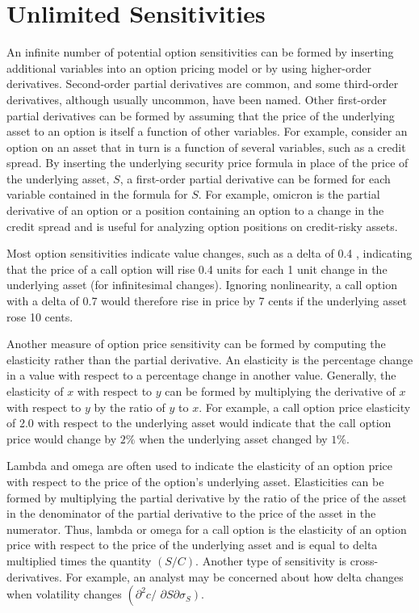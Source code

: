 \documentclass[11pt]{article}
\begin{document}
\section*{Unlimited Sensitivities}
An infinite number of potential option sensitivities can be formed by inserting additional variables into an option pricing model or by using higher-order derivatives. Second-order partial derivatives are common, and some third-order derivatives, although usually uncommon, have been named. Other first-order partial derivatives can be formed by assuming that the price of the underlying asset to an option is itself a function of other variables. For example, consider an option on an asset that in turn is a function of several variables, such as a credit spread. By inserting the underlying security price formula in place of the price of the underlying asset, $S$, a first-order partial derivative can be formed for each variable contained in the formula for $S$. For example, omicron is the partial derivative of an option or a position containing an option to a change in the credit spread and is useful for analyzing option positions on credit-risky assets.

Most option sensitivities indicate value changes, such as a delta of 0.4 , indicating that the price of a call option will rise 0.4 units for each 1 unit change in the underlying asset (for infinitesimal changes). Ignoring nonlinearity, a call option with a delta of 0.7 would therefore rise in price by 7 cents if the underlying asset rose 10 cents.

Another measure of option price sensitivity can be formed by computing the elasticity rather than the partial derivative. An elasticity is the percentage change in a value with respect to a percentage change in another value. Generally, the elasticity of $x$ with respect to $y$ can be formed by multiplying the derivative of $x$ with respect to $y$ by the ratio of $y$ to $x$. For example, a call option price elasticity of 2.0 with respect to the underlying asset would indicate that the call option price would change by $2 \%$ when the underlying asset changed by $1 \%$.

Lambda and omega are often used to indicate the elasticity of an option price with respect to the price of the option's underlying asset. Elasticities can be formed by multiplying the partial derivative by the ratio of the price of the asset in the denominator of the partial derivative to the price of the asset in the numerator. Thus, lambda or omega for a call option is the elasticity of an option price with respect to the price of the underlying asset and is equal to delta multiplied times the quantity $(S / C)$. Another type of sensitivity is cross-derivatives. For example, an analyst may be concerned about how delta changes when volatility changes $\left(\partial^{2} c /\right.$ $\left.\partial S \partial \sigma_{S}\right)$.
\end{document}

